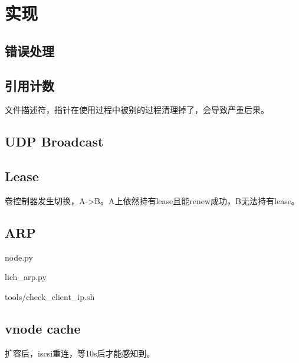 \chapter{实现}

\section{错误处理}

\section{引用计数}

文件描述符，指针在使用过程中被别的过程清理掉了，会导致严重后果。

\section{UDP Broadcast}

\section{Lease}

卷控制器发生切换，A->B。A上依然持有lease且能renew成功，B无法持有lease。

\section{ARP}

node.py

lich\_arp.py

tools/check\_client\_ip.sh

\section{vnode cache}

扩容后，iscsi重连，等10s后才能感知到。
